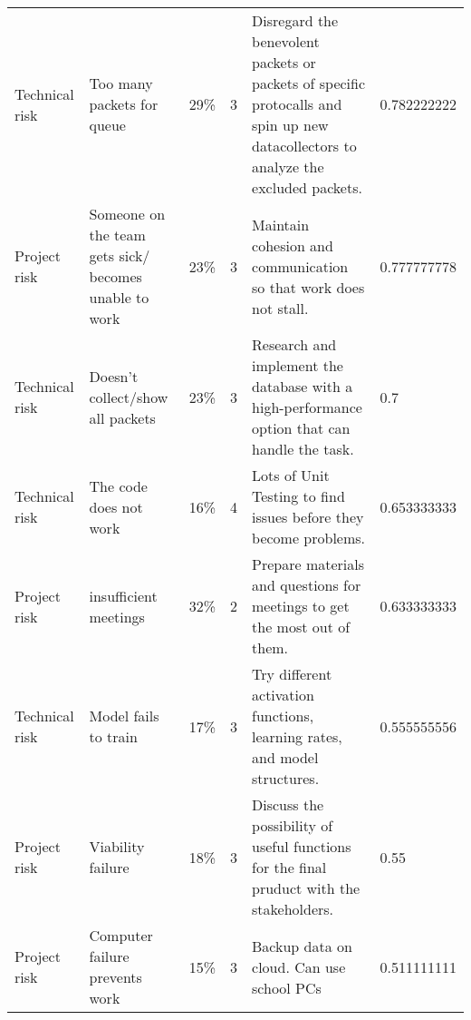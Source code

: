 \documentclass{article}
\begin{document}
\begin{table}[]
\begin{tabular}{llllll}
    Technical risk & Too many packets for queue                            & 29\%        & 3      & Disregard the benevolent packets or packets of specific protocalls and spin up new datacollectors to analyze the excluded packets.                                               & 0.782222222   \\
    Project risk   & Someone on the team gets sick/ becomes unable to work & 23\%        & 3      & Maintain cohesion and communication so that work does not stall.                                                                                                                 & 0.777777778   \\
    Technical risk & Doesn't collect/show all packets                      & 23\%        & 3      & Research and implement the database with a high-performance option that can handle the task.                                                                                     & 0.7           \\
    Technical risk & The code does not work                                & 16\%        & 4      & Lots of Unit Testing to find issues before they become problems.                                                                                                                 & 0.653333333   \\
    Project risk   & insufficient meetings                                 & 32\%        & 2      & Prepare materials and questions for meetings to get the most out of them.                                                                                                        & 0.633333333   \\
    Technical risk & Model fails to train                                  & 17\%        & 3      & Try different activation functions, learning rates, and model structures.                                                                                                        & 0.555555556   \\
    Project risk   & Viability failure                                     & 18\%        & 3      & Discuss the possibility of useful functions for the final pruduct with the stakeholders.                                                                                         & 0.55          \\
    Project risk   & Computer failure prevents work                        & 15\%        & 3      & Backup data on cloud. Can use school PCs                                                                                                                                         & 0.511111111   \\

\end{tabular}
\end{table}
\end{document}
